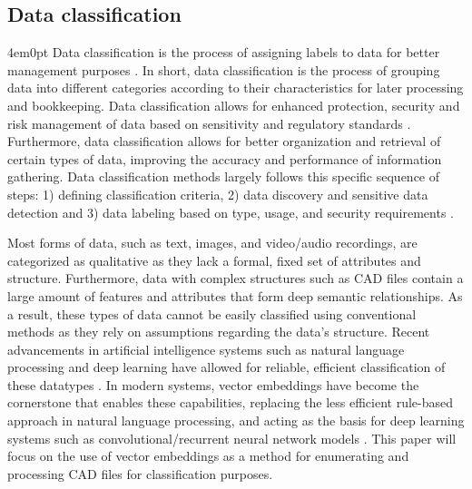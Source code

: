 	\subsection{Data classification}
		\begin{indentedblock}{4em}{0pt}
			Data classification is the process of assigning labels to data for better management purposes \parencites{data_classification_nist}{data_classification_sheela}. In short, data classification is the process of grouping data into different categories according to their characteristics for later processing and bookkeeping. Data classification allows for enhanced protection, security and risk management of data based on sensitivity and regulatory standards \parencites{role_of_data_classification_avery}{overview_of_data_classification_nguyen}{data_classification_nist}. Furthermore, data classification allows for better organization and retrieval of certain types of data, improving the accuracy and performance of information gathering. Data classification methods largely follows this specific sequence of steps: 1) defining classification criteria, 2) data discovery and sensitive data detection and 3) data labeling based on type, usage, and security requirements \parencite{data_classification_sheela}.
			
			
			Most forms of data, such as text, images, and video/audio recordings, are categorized as qualitative as they lack a formal, fixed set of attributes and structure. Furthermore, data with complex structures such as CAD files contain a large amount of features and attributes that form deep semantic relationships. As a result, these types of data cannot be easily classified using conventional methods as they rely on assumptions regarding the data's structure. Recent advancements in artificial intelligence systems such as natural language processing and deep learning have allowed for reliable, efficient classification of these datatypes \parencite{AI_driven_data_classification_moses}. In modern systems, vector embeddings have become the cornerstone that enables these capabilities, replacing the less efficient rule-based approach in natural language processing, and acting as the basis for deep learning systems such as convolutional/recurrent neural network models \parencites{text_representation_patil}{word_embedding_models_deepak}. This paper will focus on the use of vector embeddings as a method for enumerating and processing CAD files for classification purposes.
		\end{indentedblock}
	
